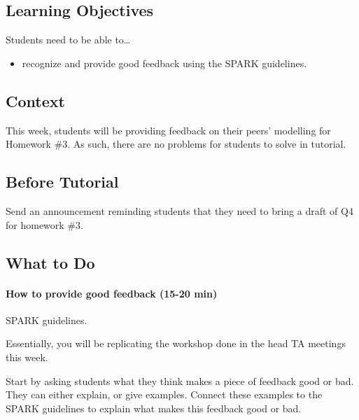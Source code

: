 \subsection*{Learning Objectives}
	Students need to be able to\ldots
	\begin{itemize}
		\item recognize and provide good feedback using the SPARK guidelines.	\end{itemize}

\subsection*{Context}
	This week, students will be providing feedback on their peers' modelling for Homework \#3. As such, there are no problems for students to solve in tutorial.
	

\subsection*{Before Tutorial}

Send an announcement reminding students that they need to bring a draft of Q4 for homework \#3.

\subsection*{What to Do}

	\paragraph{How to provide good feedback (15-20 min)}

	SPARK guidelines.
	
	Essentially, you will be replicating the workshop done in the head TA meetings this week.
	
	Start by asking students what they think makes a piece of feedback good or bad. They can either explain, or give examples. Connect these examples to the SPARK guidelines to explain what makes this feedback good or bad.
	
